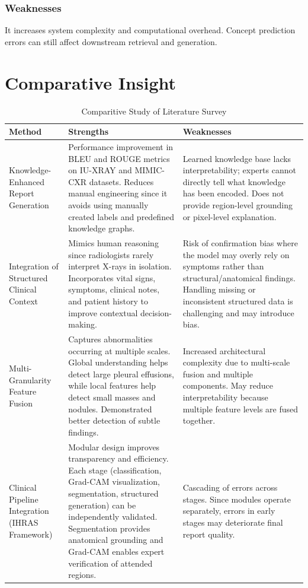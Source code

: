 \subsubsection{Weaknesses}
It increases system complexity and computational overhead. Concept prediction errors can still affect downstream retrieval and generation.
\section{Comparative Insight}
\begin{table}[h]
\centering
\caption{Comparitive Study of Literature Survey}
\label{tab:method_comparison}
\begin{tabular}{|p{4cm}|p{5.5cm}|p{5.5cm}|}
\hline
\textbf{Method} & \textbf{Strengths} & \textbf{Weaknesses} \\
\hline

Knowledge-Enhanced Report Generation 
& Performance improvement in BLEU and ROUGE metrics on IU-XRAY and MIMIC-CXR datasets. Reduces manual engineering since it avoids using manually created labels and predefined knowledge graphs. 
& Learned knowledge base lacks interpretability; experts cannot directly tell what knowledge has been encoded. Does not provide region-level grounding or pixel-level explanation. \\

\hline

Integration of Structured Clinical Context 
& Mimics human reasoning since radiologists rarely interpret X-rays in isolation. Incorporates vital signs, symptoms, clinical notes, and patient history to improve contextual decision-making. 
& Risk of confirmation bias where the model may overly rely on symptoms rather than structural/anatomical findings. Handling missing or inconsistent structured data is challenging and may introduce bias. \\

\hline

Multi-Granularity Feature Fusion 
& Captures abnormalities occurring at multiple scales. Global understanding helps detect large pleural effusions, while local features help detect small masses and nodules. Demonstrated better detection of subtle findings. 
& Increased architectural complexity due to multi-scale fusion and multiple components. May reduce interpretability because multiple feature levels are fused together. \\

\hline

Clinical Pipeline Integration (IHRAS Framework) 
& Modular design improves transparency and efficiency. Each stage (classification, Grad-CAM visualization, segmentation, structured generation) can be independently validated. Segmentation provides anatomical grounding and Grad-CAM enables expert verification of attended regions. 
& Cascading of errors across stages. Since modules operate separately, errors in early stages may deteriorate final report quality. \\


\end{tabular}
\end{table}
